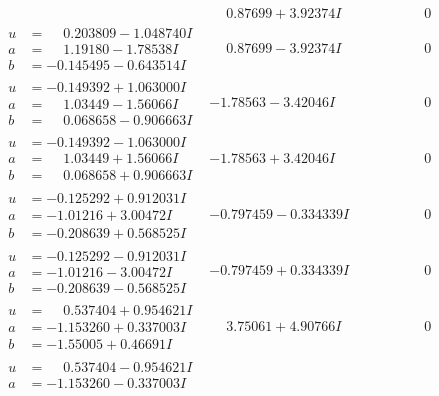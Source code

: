\documentclass[1p]{elsarticle_modified}
\theoremstyle{definition}
\begin{document}
$$\begin{array}{c|c|c}
 & \phantom{-}0.87699 + 3.92374 I & \phantom{-0.000000 } 0 \\ \hline\begin{aligned}
u &= \phantom{-}0.203809 - 1.048740 I \\
a &= \phantom{-}1.19180 - 1.78538 I \\
b &= -0.145495 - 0.643514 I\end{aligned}
 & \phantom{-}0.87699 - 3.92374 I & \phantom{-0.000000 } 0 \\ \hline\begin{aligned}
u &= -0.149392 + 1.063000 I \\
a &= \phantom{-}1.03449 - 1.56066 I \\
b &= \phantom{-}0.068658 - 0.906663 I\end{aligned}
 & -1.78563 - 3.42046 I & \phantom{-0.000000 } 0 \\ \hline\begin{aligned}
u &= -0.149392 - 1.063000 I \\
a &= \phantom{-}1.03449 + 1.56066 I \\
b &= \phantom{-}0.068658 + 0.906663 I\end{aligned}
 & -1.78563 + 3.42046 I & \phantom{-0.000000 } 0 \\ \hline\begin{aligned}
u &= -0.125292 + 0.912031 I \\
a &= -1.01216 + 3.00472 I \\
b &= -0.208639 + 0.568525 I\end{aligned}
 & -0.797459 - 0.334339 I & \phantom{-0.000000 } 0 \\ \hline\begin{aligned}
u &= -0.125292 - 0.912031 I \\
a &= -1.01216 - 3.00472 I \\
b &= -0.208639 - 0.568525 I\end{aligned}
 & -0.797459 + 0.334339 I & \phantom{-0.000000 } 0 \\ \hline\begin{aligned}
u &= \phantom{-}0.537404 + 0.954621 I \\
a &= -1.153260 + 0.337003 I \\
b &= -1.55005 + 0.46691 I\end{aligned}
 & \phantom{-}3.75061 + 4.90766 I & \phantom{-0.000000 } 0 \\ \hline\begin{aligned}
u &= \phantom{-}0.537404 - 0.954621 I \\
a &= -1.153260 - 0.337003 I \\

\end{aligned}
\end{array}$$
\end{document}
